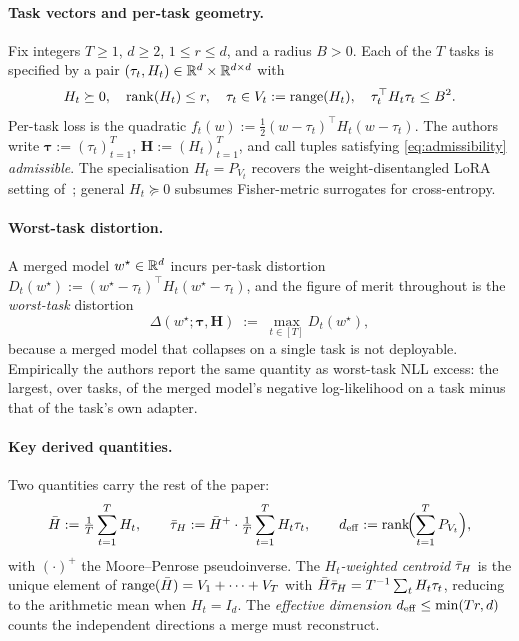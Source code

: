 \paragraph{Task vectors and per-task geometry.} Fix integers $T \geq 1$,
$d \geq 2$, $1 \leq r \leq d$, and a radius $B > 0$. Each of the $T$
tasks is specified by a pair $(\tau_t, H_t) \in \mathbb{R}^d \times \mathbb{R}^{d\times d}$
with
\begin{equation}\label{eq:admissibility}
  H_t \succeq 0,\quad \operatorname{rank}(H_t) \leq r,\quad \tau_t \in V_t :=
  \operatorname{range}(H_t),\quad \tau_t^\top H_t \tau_t \leq B^2.
\end{equation}
Per-task loss is the quadratic $f_t(w) := \tfrac12 (w - \tau_t)^\top
H_t (w - \tau_t)$. The authors write $\boldsymbol\tau := (\tau_t)_{t=1}^T$,
$\boldsymbol H := (H_t)_{t=1}^T$, and call tuples satisfying
\eqref{eq:admissibility} \emph{admissible}. The specialisation
$H_t = P_{V_t}$ recovers the weight-disentangled LoRA setting
of~\citet{ortizjimenez2023disentanglement}; general $H_t \succeq 0$
subsumes Fisher-metric surrogates for cross-entropy.

\paragraph{Worst-task distortion.} A merged model $w^\star \in \mathbb{R}^d$
incurs per-task distortion $D_t(w^\star) := (w^\star - \tau_t)^\top H_t
(w^\star - \tau_t)$, and the figure of merit throughout is the
\emph{worst-task} distortion
\begin{equation}\label{eq:worst-task}
  \Delta(w^\star; \boldsymbol\tau, \boldsymbol H)
  \;:=\; \max_{t\in[T]} D_t(w^\star),
\end{equation}
because a merged model that collapses on a single task is not deployable.
Empirically the authors report the same quantity as worst-task NLL excess: the largest,
over tasks, of the merged model's negative log-likelihood on a task minus that
of the task's own adapter.

\paragraph{Key derived quantities.} Two quantities carry the rest of the
paper:
\begin{equation}\label{eq:derived}
  \bar H := \tfrac1T\sum_{t=1}^T H_t,\qquad
  \bar{\tau}_H := \bar H^+\cdot \tfrac1T\sum_{t=1}^T H_t\tau_t,\qquad
  d_{\mathrm{eff}} := \operatorname{rank}\!\Bigl(\sum_{t=1}^T P_{V_t}\Bigr),
\end{equation}
with $(\cdot)^+$ the Moore--Penrose pseudoinverse. The \emph{$H_t$-weighted
centroid} $\bar{\tau}_H$ is the unique element of $\operatorname{range}(\bar H) = V_1 + \cdots +
V_T$ with $\bar H \bar{\tau}_H = T^{-1}\sum_t H_t \tau_t$, reducing to the arithmetic
mean when $H_t = I_d$. The \emph{effective dimension} $d_{\mathrm{eff}} \leq \min(Tr, d)$
counts the independent directions a merge must reconstruct.


